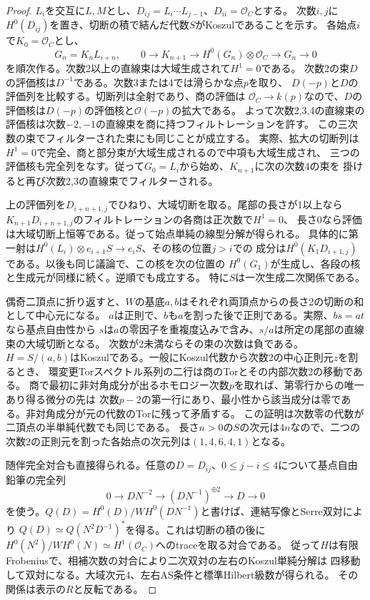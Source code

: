 \begin{proof}
$L_i$を交互に$L,M$とし、$D_{ij}=L_i\cdots L_{j-1}$、$D_{ii}=\mathcal O_C$とする。
次数$i,j$に$H^0(D_{ij})$を置き、切断の積で結んだ代数$S$がKoszulであることを示す。
各始点$i$で$K_0=\mathcal O_C$とし、
\[
 G_n=K_n L_{i+n},\qquad
 0\longrightarrow K_{n+1}\longrightarrow H^0(G_n)\otimes\mathcal O_C
 \longrightarrow G_n\longrightarrow0
\]
を順次作る。次数2以上の直線束は大域生成されて$H^1=0$である。
次数2の束$D$の評価核は$D^{-1}$である。次数3または4では滑らかな点$p$を取り、
$D(-p)$と$D$の評価列を比較する。切断列は全射であり、商の評価は
$\mathcal O_C\to k(p)$なので、$D$の評価核は$D(-p)$の評価核と$\mathcal O(-p)$の拡大である。
よって次数2,3,4の直線束の評価核は次数$-2,-1$の直線束を商に持つフィルトレーションを許す。
この三次数の束でフィルターされた束にも同じことが成立する。
実際、拡大の切断列は$H^1=0$で完全、商と部分束が大域生成されるので中項も大域生成され、
三つの評価核も完全列をなす。従って$G_0=L_i$から始め、$K_{n+1}$に次の次数4の束を
掛けると再び次数2,3の直線束でフィルターされる。

上の評価列を$D_{i+n+1,j}$でひねり、大域切断を取る。尾部の長さが1以上なら
$K_{n+1}D_{i+n+1,j}$のフィルトレーションの各商は正次数で$H^1=0$、
長さ0なら評価は大域切断上恒等である。従って始点単純の線型分解が得られる。
具体的に第一射は$H^0(L_i)\otimes e_{i+1}S\to e_iS$、その核の位置$j>i$での
成分は$H^0(K_1D_{i+1,j})$である。以後も同じ議論で、この核を次の位置の
$H^0(G_1)$が生成し、各段の核と生成元が同様に続く。逆順でも成立する。
特に$S$は一次生成二次関係である。

偶奇二頂点に折り返すと、$W$の基底$a,b$はそれぞれ両頂点からの長さ2の切断の和として中心元になる。
$a$は正則で、$b$も$a$を割った後で正則である。実際、$bs=at$なら基点自由性から
$s$は$a$の零因子を重複度込みで含み、$s/a$は所定の尾部の直線束の大域切断となる。
次数が2未満ならその束の次数は負である。
$H=S/(a,b)$はKoszulである。一般にKoszul代数から次数2の中心正則元$z$を割るとき、
環変更Torスペクトル系列の二行は商のTorとその内部次数2の移動である。
商で最初に非対角成分が出るホモロジー次数$p$を取れば、第零行からの唯一あり得る微分の先は
次数$p-2$の第一行にあり、最小性から該当成分は零である。非対角成分が元の代数のTorに残って矛盾する。
この証明は次数零の代数が二頂点の半単純代数でも同じである。
長さ$n>0$の$S$の次元は$4n$なので、二つの次数2の正則元を割った各始点の次元列は$(1,4,6,4,1)$となる。

随伴完全対合も直接得られる。任意の$D=D_{ij}$、$0\le j-i\le4$について基点自由鉛筆の完全列
\[
 0\to DN^{-2}\to (DN^{-1})^{\oplus2}\to D\to0
\]
を使う。$Q(D)=H^0(D)/W H^0(DN^{-1})$と書けば、連結写像とSerre双対により
$Q(D)\simeq Q(N^2 D^{-1})^*$を得る。これは切断の積の後に
$H^0(N^2)/W H^0(N)\simeq H^1(\mathcal O_C)$へのtraceを取る対合である。
従って$H$は有限Frobeniusで、相補次数の対合により二次双対の左右のKoszul単純分解は
四移動して双対になる。大域次元4、左右AS条件と標準Hilbert級数が得られる。
その関係は表示の$R$と反転である。


\end{proof}
